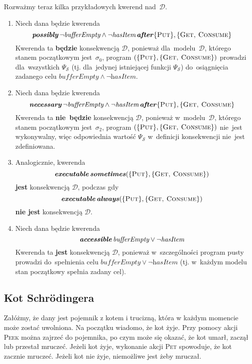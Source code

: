 \documentclass[11pt,a4paper]{article}
\DeclareMathOperator{\After}{\textbf{\textit{after}}}
\DeclareMathOperator{\Always}{\textbf{\textit{always}}}
\DeclareMathOperator{\Sometimes}{\textbf{\textit{sometimes}}}
\DeclareMathOperator{\Executable}{\textbf{\textit{executable}}}
\DeclareMathOperator{\Accessible}{\textbf{\textit{accessible}}}
\DeclareMathOperator{\Possibly}{\textbf{\textit{possibly}}}
\DeclareMathOperator{\Necessary}{\textbf{\textit{necessary}}}
\begin{document}
Rozważmy teraz kilka przykładowych kwerend nad~$\mathcal{D}$.

\begin{enumerate}
    \item Niech dana będzie kwerenda
    $$ \Possibly \neg \textit{bufferEmpty} \land \neg \textit{hasItem} \After \{ \textsc{Put} \}, \{ \textsc{Get, Consume} \} $$
    Kwerenda ta \textbf{będzie} konsekwencją $\mathcal{D}$, ponieważ dla~modelu~$\mathcal{D}$, którego stanem początkowym jest~$\sigma_0$, program $(\{ \textsc{Put} \}, \{ \textsc{Get, Consume} \})$ prowadzi dla~wszystkich $\Psi_\mathcal{S}$ (tj. dla~jedynej istniejącej funkcji $\Psi_\mathcal{S}$) do~osiągnięcia zadanego celu $\textit{bufferEmpty} \land \neg \textit{hasItem}$.

    \item Niech dana będzie kwerenda
    $$ \Necessary \neg \textit{bufferEmpty} \land \neg \textit{hasItem} \After \{ \textsc{Put} \}, \{ \textsc{Get, Consume} \} $$
    Kwerenda ta \textbf{nie~będzie} konsekwencją $\mathcal{D}$, ponieważ w~modelu~$\mathcal{D}$, którego stanem początkowym jest~$\sigma_2$, program $(\{ \textsc{Put} \}, \{ \textsc{Get, Consume} \})$ nie~jest wykonywalny, więc odpowiednia wartość $\Psi_\mathcal{S}$ w~definicji konsekwencji nie~jest zdefiniowana.

    \item Analogicznie, kwerenda
    $$\Executable \Sometimes (\{ \textsc{Put} \}, \{ \textsc{Get, Consume} \})$$
    \textbf{jest} konsekwencją $\mathcal{D}$, podczas gdy
    $$\Executable \Always (\{ \textsc{Put} \}, \{ \textsc{Get, Consume} \})$$
    \textbf{nie jest} konsekwencją $\mathcal{D}$.

    \item Niech dana będzie kwerenda
    $$ \Accessible \textit{bufferEmpty} \lor \neg \textit{hasItem} $$
    Kwerenda ta \textbf{jest} konsekwencją $\mathcal{D}$, ponieważ w~szczególności program pusty prowadzi do~spełnienia celu $\textit{bufferEmpty} \lor \neg \textit{hasItem}$ (tj. w~każdym modelu stan początkowy spełnia zadany cel).
\end{enumerate}

\subsection{Kot Schrödingera}
\label{subsec:schrodingers-cat-example}

Załóżmy, że dany jest pojemnik z kotem i trucizną, która w każdym momencie może zostać uwolniona. Na początku wiadomo, że kot żyje. Przy pomocy akcji \textsc{Peek} można zajrzeć do pojemnika, po czym może się okazać, że kot umarł, zaczął lub przestał mruczeć. Jeżeli kot żyje, wykonanie akcji \textsc{Pet} spowoduje, że kot zacznie mruczeć. Jeżeli kot nie żyje, niemożliwe jest żeby mruczał.
\end{document}
